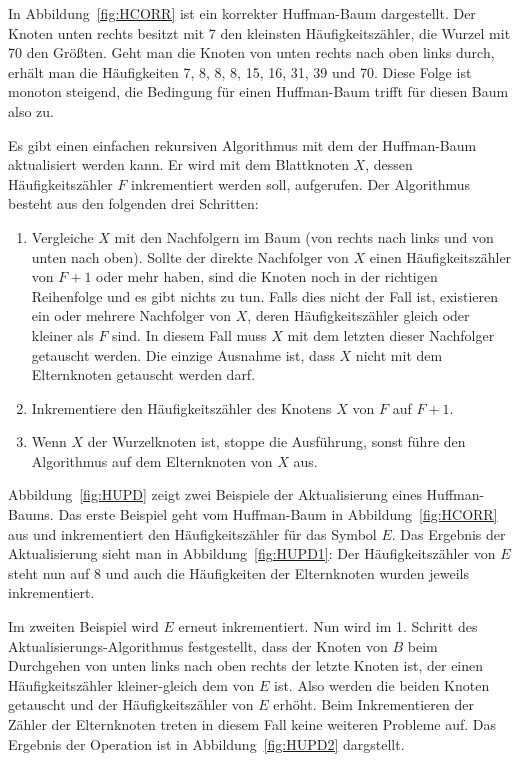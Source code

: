 \documentclass[twoside,11pt,a4paper]{article}
\theoremstyle{break}
\begin{document}
In Abbildung~\ref{fig:HCORR} ist ein korrekter Huffman-Baum
dargestellt. Der Knoten unten rechts besitzt mit 7 den kleinsten
Häufigkeitszähler, die Wurzel mit 70 den Größten. Geht man die Knoten
von unten rechts nach oben links durch, erhält man die Häufigkeiten 7,
8, 8, 8, 15, 16, 31, 39 und 70. Diese Folge ist monoton steigend, die
Bedingung für einen Huffman-Baum trifft für diesen Baum also zu.

Es gibt einen einfachen rekursiven Algorithmus mit dem der
Huffman-Baum aktualisiert werden kann. Er wird mit dem Blattknoten
$X$, dessen Häufigkeitszähler $F$ inkrementiert werden soll,
aufgerufen. Der Algorithmus besteht aus den folgenden drei Schritten:

\begin{enumerate}
\item Vergleiche $X$ mit den Nachfolgern im Baum (von rechts nach
  links und von unten nach oben). Sollte der direkte Nachfolger von
  $X$ einen Häufigkeitszähler von $F+1$ oder mehr haben, sind die
  Knoten noch in der richtigen Reihenfolge und es gibt nichts zu tun.
  Falls dies nicht der Fall ist, existieren ein oder mehrere
  Nachfolger von $X$, deren Häufigkeitszähler gleich oder kleiner als
  $F$ sind. In diesem Fall muss $X$ mit dem letzten dieser Nachfolger
  getauscht werden. Die einzige Ausnahme ist, dass $X$ nicht mit dem
  Elternknoten getauscht werden darf.
\item Inkrementiere den Häufigkeitszähler des Knotens $X$ von $F$ auf
  $F+1$.
\item Wenn $X$ der Wurzelknoten ist, stoppe die Ausführung, sonst
  führe den Algorithmus auf dem Elternknoten von $X$ aus.
\end{enumerate}

Abbildung~\ref{fig:HUPD} zeigt zwei Beispiele der Aktualisierung eines
Huffman-Baums. Das erste Beispiel geht vom Huffman-Baum in
Abbildung~\ref{fig:HCORR} aus und inkrementiert den Häufigkeitszähler
für das Symbol $E$. Das Ergebnis der Aktualisierung sieht man in
Abbildung~\ref{fig:HUPD1}: Der Häufigkeitszähler von $E$ steht nun auf
8 und auch die Häufigkeiten der Elternknoten wurden jeweils
inkrementiert.

Im zweiten Beispiel wird $E$ erneut inkrementiert. Nun wird im
1. Schritt des Aktualisierungs-Algorithmus festgestellt, dass der
Knoten von $B$ beim Durchgehen von unten links nach oben rechts der
letzte Knoten ist, der einen Häufigkeitszähler kleiner-gleich dem von
$E$ ist. Also werden die beiden Knoten getauscht und der
Häufigkeitszähler von $E$ erhöht. Beim Inkrementieren der Zähler der
Elternknoten treten in diesem Fall keine weiteren Probleme auf. Das
Ergebnis der Operation ist in Abbildung~\ref{fig:HUPD2} dargstellt.
\end{document}
